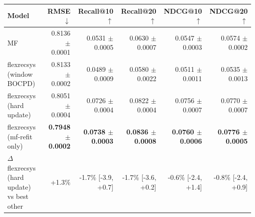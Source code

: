 \begin{tabular}{lrrrrr}
\toprule
Model & RMSE $\downarrow$ & Recall@10 $\uparrow$ & Recall@20 $\uparrow$ & NDCG@10 $\uparrow$ & NDCG@20 $\uparrow$ \\
\midrule
MF & 0.8136 $\pm$ 0.0001 & 0.0531 $\pm$ 0.0005 & 0.0630 $\pm$ 0.0007 & 0.0547 $\pm$ 0.0003 & 0.0574 $\pm$ 0.0002 \\
flexrecsys (window BOCPD) & 0.8133 $\pm$ 0.0002 & 0.0489 $\pm$ 0.0009 & 0.0580 $\pm$ 0.0022 & 0.0511 $\pm$ 0.0011 & 0.0535 $\pm$ 0.0013 \\
flexrecsys (hard update) & 0.8051 $\pm$ 0.0004 & 0.0726 $\pm$ 0.0004 & 0.0822 $\pm$ 0.0004 & 0.0756 $\pm$ 0.0007 & 0.0770 $\pm$ 0.0007 \\
flexrecsys (mf-refit only) & \textbf{0.7948 $\pm$ 0.0002} & \textbf{0.0738 $\pm$ 0.0003} & \textbf{0.0836 $\pm$ 0.0008} & \textbf{0.0760 $\pm$ 0.0006} & \textbf{0.0776 $\pm$ 0.0005} \\
\midrule
$\Delta$ flexrecsys (hard update) vs best other & +1.3\% & -1.7\% [-3.9, +0.7] & -1.7\% [-3.6, +0.2] & -0.6\% [-2.4, +1.4] & -0.8\% [-2.4, +0.9] \\
\bottomrule
\end{tabular}
